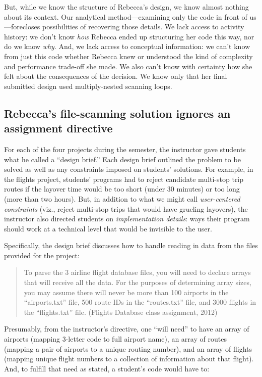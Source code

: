 But, while we know the structure of Rebecca's design, we know almost nothing about its context. Our analytical method---examining only the code in front of us---forecloses possibilities of recovering those details. We lack access to activity history: we don't know \emph{how} Rebecca ended up structuring her code this way, nor do we know \emph{why}. And, we lack access to conceptual information: we can't know from just this code whether Rebecca knew or understood the kind of complexity and performance trade-off she made. We also can't know with certainty how she felt about the consequences of the decision. We know only that her final submitted design used multiply-nested scanning loops.

\subsection{Rebecca's file-scanning solution ignores an assignment directive}\label{rebeccas-file-scanning-solution-ignores-an-assignment-directive}

For each of the four projects during the semester, the instructor gave students what he called a ``design brief.'' Each design brief outlined the problem to be solved as well as any constraints imposed on students' solutions. For example, in the flights project, students' programs had to reject candidate multi-stop trip routes if the layover time would be too short (under 30 minutes) or too long (more than two hours). But, in addition to what we might call \emph{user-centered constraints} (viz., reject multi-stop trips that would have grueling layovers), the instructor also directed students on \emph{implementation details}: ways their program should work at a technical level that would be invisible to the user.

Specifically, the design brief discusses how to handle reading in data from the files provided for the project:

\begin{quote}
To parse the 3 airline flight database files, you will need to declare arrays that will receive all the data. For the purposes of determining array sizes, you may assume there will never be more than 100 airports in the ``airports.txt'' file, 500 route IDs in the ``routes.txt'' file, and 3000 flights in the ``flights.txt'' file. (Flights Database class assignment, 2012)
\end{quote}

Presumably, from the instructor's directive, one ``will need'' to have an array of airports (mapping 3-letter code to full airport name), an array of routes (mapping a pair of airports to a unique routing number), and an array of flights (mapping unique flight numbers to a collection of information about that flight). And, to fulfill that need as stated, a student's code would have to:

